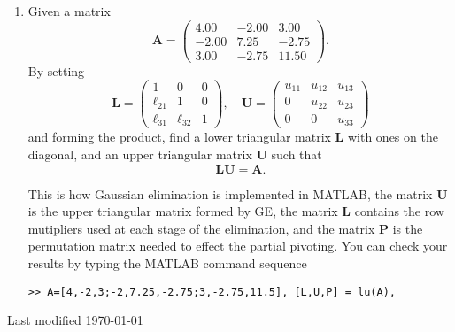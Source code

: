 \documentclass[11pt,a4paper]{article}
\def\bA{\mathbf{A}}
\begin{document}
\begin{enumerate}
\item\label{qdjsx4}
Given a matrix
$$\bA= \left ( \begin{array}{rrr}
         4.00 & -2.00 & 3.00\\
        -2.00 &  7.25 & -2.75 \\
         3.00 & -2.75 & 11.50 \
         \end{array} \right ) . $$
  By setting 
$$  \mathbf{L} =  \left ( \begin{array}{rrr}
         1 & 0 & 0\\
        \ell_{21} &  1 &  0 \\
        \ell_{31} & \ell_{32} & 1
         \end{array} \right ),  \quad
          \mathbf{U} =  \left ( \begin{array}{rrr}
         u_{11} & u_{12} & u_{13} \\
        0  &  u_{22} & u_{23} \\
        0 & 0  & u_{33}    \end{array} \right )
        $$
 and forming the product,
find a lower triangular matrix $ \mathbf{L}$ with ones on the diagonal,
and an upper  triangular matrix $ \mathbf{U}$ such that 
$$  \mathbf{L} \mathbf{U} = \bA.$$

 This is how Gaussian elimination is implemented in MATLAB,
 the matrix $\mathbf{U} $ is the upper triangular matrix formed by GE, the
 matrix $\mathbf{L} $ contains the row mutipliers used at each stage
 of the elimination, and the matrix $\mathbf{P}$  is the permutation 
 matrix   needed  to effect the partial pivoting.
You can check your results by typing the MATLAB command sequence
\begin{verbatim}
>> A=[4,-2,3;-2,7.25,-2.75;3,-2.75,11.5], [L,U,P] = lu(A),
\end{verbatim}



\end{enumerate}
\hfill {\tiny Last modified  \today}
\vfill\eject
\end{document}
